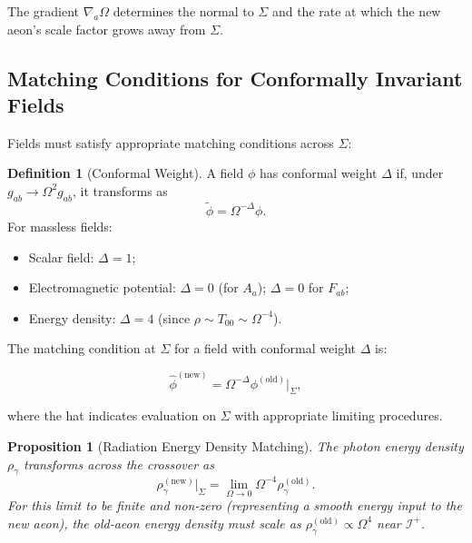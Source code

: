 \documentclass[11pt,a4paper]{article}
\theoremstyle{plain}
\newtheorem{proposition}[theorem]{Proposition}
\theoremstyle{definition}
\newtheorem{definition}[theorem]{Definition}
\theoremstyle{remark}
\newcommand{\scriplus}{\mathcal{I}^+}
\begin{document}
The gradient $\nabla_a \Omega$ determines the normal to $\Sigma$ and the rate at which the new aeon's scale factor grows away from $\Sigma$.

\subsection{Matching Conditions for Conformally Invariant Fields}

Fields must satisfy appropriate matching conditions across $\Sigma$:

\begin{definition}[Conformal Weight]\label{def:conformal_weight}
A field $\phi$ has conformal weight $\Delta$ if, under $g_{ab} \to \Omega^2 g_{ab}$, it transforms as
\begin{equation}
    \tilde{\phi} = \Omega^{-\Delta} \phi.
\end{equation}
For massless fields:
\begin{itemize}
    \item Scalar field: $\Delta = 1$;
    \item Electromagnetic potential: $\Delta = 0$ (for $A_a$); $\Delta = 0$ for $F_{ab}$;
    \item Energy density: $\Delta = 4$ (since $\rho \sim T_{00} \sim \Omega^{-4}$).
\end{itemize}
\end{definition}

The matching condition at $\Sigma$ for a field with conformal weight $\Delta$ is:

\begin{equation}\label{eq:matching_condition}
    \hat{\phi}^{(\text{new})} = \Omega^{-\Delta} \phi^{(\text{old})}\big|_\Sigma,
\end{equation}

where the hat indicates evaluation on $\Sigma$ with appropriate limiting procedures.

\begin{proposition}[Radiation Energy Density Matching]\label{prop:energy_matching}
The photon energy density $\rho_\gamma$ transforms across the crossover as
\begin{equation}\label{eq:rho_matching}
    \rho_\gamma^{(\text{new})}\big|_\Sigma = \lim_{\Omega \to 0} \Omega^{-4} \rho_\gamma^{(\text{old})}.
\end{equation}
For this limit to be finite and non-zero (representing a smooth energy input to the new aeon), the old-aeon energy density must scale as $\rho_\gamma^{(\text{old})} \propto \Omega^4$ near $\scriplus$.
\end{proposition}
\end{document}
